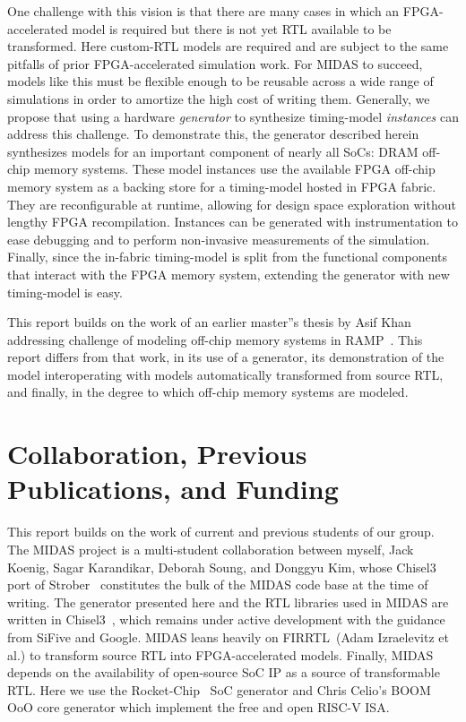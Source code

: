 One challenge with this vision is that there are many cases in which an
FPGA-accelerated model is required but there is not yet RTL available to be
transformed. Here custom-RTL models are required and are subject to the same
pitfalls of prior FPGA-accelerated simulation work. For MIDAS to
succeed, models like this must be flexible enough to be reusable across a wide
range of simulations in order to amortize the high cost of writing them.
Generally, we propose that using a hardware \emph{generator} to synthesize
timing-model \emph{instances} can address this challenge. To demonstrate this, the
generator described herein synthesizes models for an important component of
nearly all SoCs: DRAM off-chip memory systems. These model instances use the
available FPGA off-chip memory system as a backing store for a timing-model
hosted in FPGA fabric. They are reconfigurable at runtime, allowing for
design space exploration without lengthy FPGA recompilation. Instances can be
generated with instrumentation to ease debugging and to perform non-invasive
measurements of the simulation. Finally, since the in-fabric timing-model is
split from the functional components that interact with the FPGA memory system,
extending the generator with new timing-model is easy.

This report builds on the work of an earlier master''s thesis by Asif
Khan~\cite{khanmasters} addressing challenge of modeling off-chip memory
systems in RAMP~\cite{ramp}. This report differs from that work, in its use of
a generator, its demonstration of the model interoperating with models
automatically transformed from source RTL, and finally, in the degree to which
off-chip memory systems are modeled.

\section{Collaboration, Previous Publications, and Funding}

This report builds on the work of current and previous students of
our group. The MIDAS project is a multi-student collaboration between myself,
Jack Koenig, Sagar Karandikar, Deborah Soung, and Donggyu Kim, whose Chisel3
port of Strober~\cite{strober} constitutes the bulk of the MIDAS code
base at the time of writing. The generator presented here and the RTL libraries used
in MIDAS are written in Chisel3~\cite{chisel}, which remains under active
development with the guidance from SiFive and Google. MIDAS leans heavily on
FIRRTL~\cite{firrtl}(Adam Izraelevitz et al.) to transform source RTL into
FPGA-accelerated models. Finally, MIDAS depends on the availability of
open-source SoC IP as a source of transformable RTL. Here we use the
Rocket-Chip~\cite{rocketchip} SoC generator and Chris Celio's BOOM~\cite{boom}
OoO core generator which implement the free and open RISC-V ISA.

